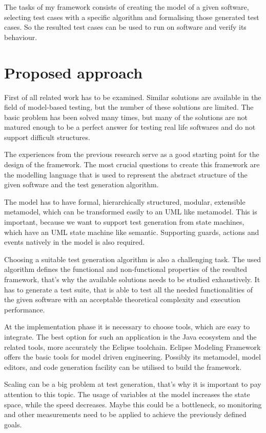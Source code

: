The tasks of my framework consists of creating the model of a given software, selecting test cases with a specific algorithm and formalising those generated test cases. So the resulted test cases can be used to run on software and verify its behaviour.


\section*{Proposed approach}
\label{sec:proposedapproach}

First of all related work has to be examined. Similar solutions are available in the field of model-based testing, but the number of these solutions are limited. The basic problem has been solved many times, but many of the solutions are not matured enough to be a perfect answer for testing real life softwares and do not support difficult structures.

The experiences from the previous research serve as a good starting point for the design of the framework. The most crucial questions to create this framework are the modelling language that is used to represent the abstract structure of the given software and the test generation algorithm. 

The model has to have formal, hierarchically structured, modular, extensible metamodel, which can be transformed easily to an UML like metamodel. This is important, because we want to support test generation from state machines, which have an UML state machine like semantic. Supporting guards, actions and events natively in the model is also required.

Choosing a suitable test generation algorithm is also a challenging task. The used algorithm defines the functional and non-functional properties of the resulted framework, that's why the available solutions needs to be studied exhaustively. It has to generate a test suite, that is able to test all the needed functionalities of the given software with an acceptable theoretical complexity and execution performance.

At the implementation phase it is necessary to choose tools, which are easy to integrate. The best option for such an application is the Java ecosystem and the related tools, more accurately the Eclipse toolchain. Eclipse Modeling Framework offers the basic tools for model driven engineering. Possibly its metamodel, model editors, and code generation facility can be utilised to build the framework.

Scaling can be a big problem at test generation, that's why it is important to pay attention to this topic. The usage of variables at the model increases the state space, while the speed decreases. Maybe this could be a bottleneck, so monitoring and other measurements need to be applied to achieve the previously defined goals.


